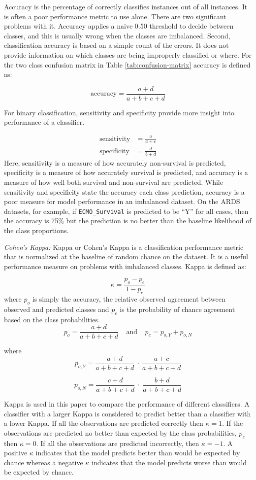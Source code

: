 \documentclass[12pt,]{article}
\begin{document}
Accuracy is the percentage of correctly classifies instances out of all
instances. It is often a poor performance metric to use alone. There are
two significant problems with it. Accuracy applies a naive 0.50
threshold to decide between classes, and this is usually wrong when the
classes are imbalanced. Second, classification accuracy is based on a
simple count of the errors. It does not provide information on which
classes are being improperly classified or where. For the two class
confusion matrix in Table \ref{tab:confusion-matrix} accuracy is defined
as:

\[
\text{accuracy} = \frac{a+d}{a+b+c+d}
\]

For binary classification, sensitivity and specificity provide more
insight into performance of a classifier.

\[
\begin{aligned}
\text{sensitivity} &= \frac{a}{a+c} \\
\text{specificity} &= \frac{d}{b+d}
\end{aligned}
\] Here, sensitivity is a measure of how accurately non-survival is
predicted, specificity is a measure of how accurately survival is
predicted, and accuracy is a measure of how well both survival and
non-survival are predicted. While sensitivity and specificity state the
accuracy each class prediction, accuracy is a poor measure for model
performance in an imbalanced dataset. On the ARDS datasets, for example,
if \texttt{ECMO\_Survival} is predicted to be ``Y'' for all cases, then
the accuracy is 75\% but the prediction is no better than the baseline
likelihood of the class proportions.

\emph{Cohen's Kappa:} Kappa or Cohen's Kappa
\autocite{cohen_coefficient_1960} is a classification performance metric
that is normalized at the baseline of random chance on the dataset. It
is a useful performance measure on problems with imbalanced classes.
Kappa is defined as:

\[
\kappa = \frac{p_o - p_e}{1 - p_e}
\] where \(p_o\) is simply the accuracy, the relative observed agreement
between observed and predicted classes and \(p_e\) is the probability of
chance agreement based on the class probabilities. \[
p_o = \frac{a+d}{a+b+c+d}  ~~~~~\text{and}~~~~~ p_e = p_{o,Y} + p_{o,N} 
\]

where \[
p_{o,Y} = \frac{a+d}{a+b+c+d} ~\cdot~ \frac{a+c}{a+b+c+d}
\]

\[
p_{o,N} = \frac{c+d}{a+b+c+d} ~\cdot~ \frac{b+d}{a+b+c+d}
\]

Kappa is used in this paper to compare the performance of different
classifiers. A classifier with a larger Kappa is considered to predict
better than a classifier with a lower Kappa. If all the observations are
predicted correctly then \(\kappa=1\). If the observations are predicted
no better than expected by the class probabilities, \(p_e\) then
\(\kappa=0\). If all the observations are predicted incorrectly, then
\(\kappa=-1\). A positive \(\kappa\) indicates that the model predicts
better than would be expected by chance whereas a negative \(\kappa\)
indicates that the model predicts worse than would be expected by
chance.
\end{document}
